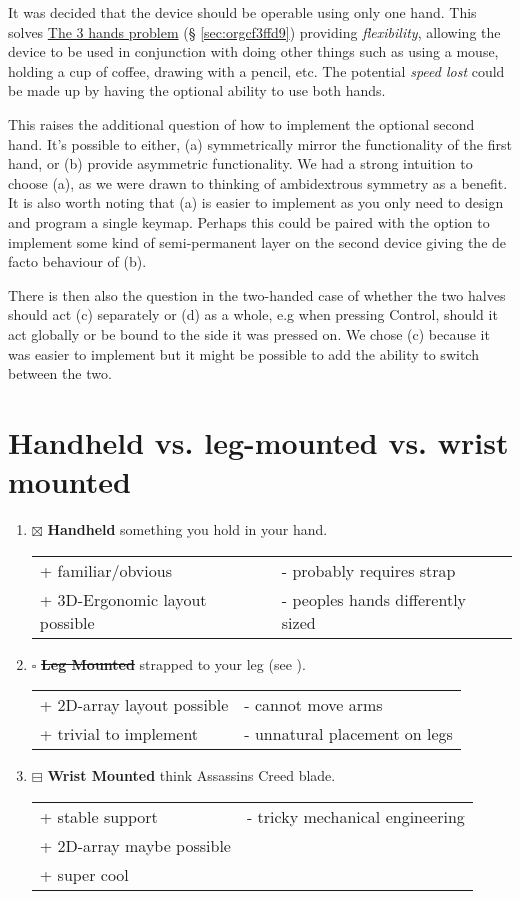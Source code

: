 \documentclass[logo,bsc,singlespacing,parskip]{infthesis}
\begin{document}
It was decided that the device should be operable using only one hand.
This solves \hyperref[sec:orgcf3ffd9]{The 3 hands problem} (§ \ref{sec:orgcf3ffd9}) providing \emph{flexibility}, allowing the device to be used in conjunction with doing other things such as using a mouse, holding a cup of coffee, drawing with a pencil, etc.
The potential \emph{speed lost} could be made up by having the optional ability to use both hands.

This raises the additional question of how to implement the optional second hand.
It's possible to either, (a) symmetrically mirror the functionality of the first hand, or (b) provide asymmetric functionality.
We had a strong intuition to choose (a), as we were drawn to thinking of ambidextrous symmetry as a benefit.
It is also worth noting that (a) is easier to implement as you only need to design and program a single keymap.
Perhaps this could be paired with the option to implement some kind of semi-permanent layer on the second device giving the de facto behaviour of (b).

There is then also the question in the two-handed case of whether the two halves should act (c) separately or (d) as a whole, e.g when pressing Control, should it act globally or be bound to the side it was pressed on.
We chose (c) because it was easier to implement but it might be possible to add the ability to switch between the two.
\section{Handheld vs. leg-mounted vs. wrist mounted}
\label{sec:org14f15bb}
\begin{enumerate}
\item{$\boxtimes$} \textbf{Handheld} something you hold in your hand.
\begin{longtable}{|p{6.25cm}|p{6.25cm}|}
\hline
+ familiar/obvious & - probably requires strap\\
+ 3D-Ergonomic layout possible & - peoples hands differently sized\\
\hline
\end{longtable}
\item{$\square$} \sout{\textbf{Leg Mounted}} strapped to your leg (see \autocite{SimulaVR2021}).
\begin{longtable}{|p{6.25cm}|p{6.25cm}|}
\hline
+ 2D-array layout possible & - cannot move arms\\
+ trivial to implement & - unnatural placement on legs\\
\hline
\end{longtable}
\item{$\boxminus$} \textbf{Wrist Mounted} think Assassins Creed blade.
\begin{longtable}{|p{6.25cm}|p{6.25cm}|}
\hline
+ stable support & - tricky mechanical engineering\\
+ 2D-array maybe possible & \\
+ super cool & \\
\hline
\end{longtable}
\end{enumerate}
\end{document}
